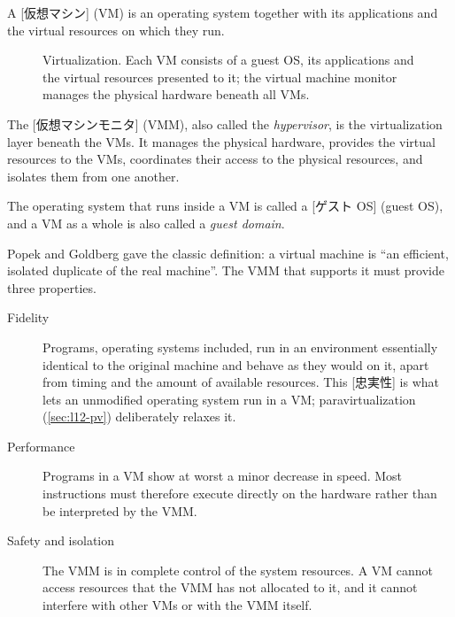 \documentclass[../main.tex]{subfiles}
\begin{document}
\begin{definition}
  A [仮想マシン] (VM) is an operating system together
  with its applications and the virtual resources on which they run.
\end{definition}

\begin{figure}[htbp]
  \centering
  
  \caption{Virtualization.  Each VM consists of a guest OS, its
    applications and the virtual resources presented to it; the virtual
    machine monitor manages the physical hardware beneath all VMs.}
  \label{fig:l12-vmm}
\end{figure}

\begin{definition}
  The [仮想マシンモニタ] (VMM), also called
  the \emph{hypervisor}, is the virtualization layer beneath the VMs.  It
  manages the physical hardware, provides the virtual resources to the VMs,
  coordinates their access to the physical resources, and isolates them
  from one another.
\end{definition}
%

The operating system that runs inside a VM is called a
[ゲスト OS] (guest OS), and a VM as a whole is
also called a \emph{guest domain}.

Popek and Goldberg \cite{popek1974} gave the classic definition: a virtual
machine is \enquote{an efficient, isolated duplicate of the real machine}.
The VMM that supports it must provide three properties.%
\begin{description}
  \item[Fidelity] Programs, operating systems included, run in an
    environment essentially identical to the original machine and behave
    as they would on it, apart from timing and the amount of available
    resources.  This [忠実性] is what lets an unmodified
    operating system run in a VM; paravirtualization
    (\cref{sec:l12-pv}) deliberately relaxes it.
  \item[Performance] Programs in a VM show at worst a minor decrease in
    speed.  Most instructions must therefore execute directly on the
    hardware rather than be interpreted by the VMM.
  \item[Safety and isolation] The VMM is in complete control of the system
    resources.  A VM cannot access resources that the VMM has not allocated
    to it, and it cannot interfere with other VMs or with the VMM itself.
\end{description}
\end{document}

